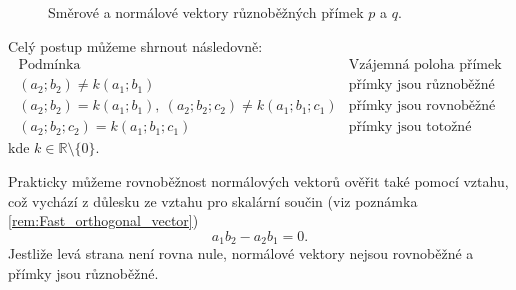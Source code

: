\begin{figure}[H]

    \caption{Směrové a normálové vektory různoběžných přímek $p$ a $q$.}
    \label{fig:Direction_normal_vectors_lines}
\end{figure}

Celý postup můžeme shrnout následovně:
\[
\begin{array}{c|c}
\text{Podmínka}
&
\text{Vzájemná poloha přímek}
\\
\hline
(a_2;b_2)\neq k(a_1;b_1)
&
\text{přímky jsou různoběžné}
\\[1mm]
(a_2;b_2)=k(a_1;b_1),\ (a_2;b_2;c_2)\neq k(a_1;b_1;c_1)
&
\text{přímky jsou rovnoběžné}
\\[1mm]
(a_2;b_2;c_2)=k(a_1;b_1;c_1)
&
\text{přímky jsou totožné}
\end{array}
\]
kde $k\in\mathbb{R}\setminus\{0\}$.

Prakticky můžeme rovnoběžnost normálových vektorů ověřit také pomocí vztahu,
což vychází z důlesku ze vztahu pro skalární součin (viz poznámka \ref{rem:Fast_orthogonal_vector})
\begin{equation}\label{eq:Parallel_general_lines_condition}
    a_1b_2-a_2b_1=0.
\end{equation}
Jestliže levá strana není rovna nule, normálové vektory nejsou
rovnoběžné a přímky jsou různoběžné.


